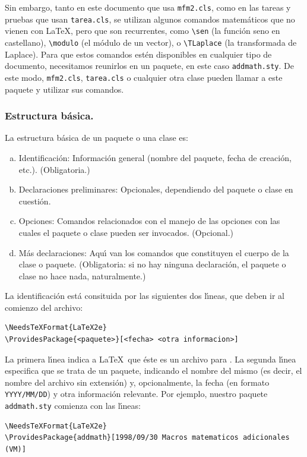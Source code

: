 {Sin embargo, tanto en este documento que usa \verb+mfm2.cls+, como
en las tareas y pruebas que usan \verb+tarea.cls+, se utilizan algunos
comandos matem\'aticos que no vienen con \LaTeX, pero que son
recurrentes, como \verb+\sen+ (la funci\'on seno en castellano),
\verb+\modulo+ (el m\'odulo de un vector),
 o \verb+\TLaplace+ (la transformada de Laplace).  Para que estos
 comandos est\'en disponibles en cualquier tipo de documento,
 necesitamos reunirlos en un paquete, en este caso
 \verb+addmath.sty+. De este modo, \verb+mfm2.cls+,
 \verb+tarea.cls+ o cualquier otra clase 
pueden llamar a este paquete y utilizar sus comandos. 

\subsubsection{Estructura b\'asica.}

La estructura b\'asica de un paquete o una clase es: 
\begin{enumerate}[a)]
\item Identificaci\'on: Informaci\'on general (nombre del
  paquete, fecha de creaci\'on, etc.). (Obligatoria.)
\item Declaraciones preliminares: Opcionales, dependiendo del paquete
  o clase en cuesti\'on. 
\item Opciones: Comandos relacionados con el manejo de las opciones
  con las cuales el paquete o clase pueden ser invocados. (Opcional.)
\item M\'as declaraciones: Aqu\'{\i} van los comandos que constituyen
  el cuerpo de la clase o paquete. (Obligatoria: si no hay ninguna
  declaraci\'on, el paquete o clase no hace nada, naturalmente.)
\end{enumerate}

La identificaci\'on est\'a consituida por las siguientes dos
l\'{\i}neas, que deben ir al comienzo del archivo:
\begin{verbatim}
\NeedsTeXFormat{LaTeX2e}
\ProvidesPackage{<paquete>}[<fecha> <otra informacion>]
\end{verbatim}

La primera l\'{\i}nea indica a \LaTeX\ que \'este es un archivo para
\LaTeXe. La segunda l\'{\i}nea especifica que se trata de un paquete,
indicando el nombre del mismo (es decir, el nombre del archivo sin
extensi\'on) y, opcionalmente, la fecha (en formato 
\verb+YYYY/MM/DD+) y otra informaci\'on relevante. Por ejemplo,
nuestro paquete \verb+addmath.sty+ comienza con las l\'{\i}neas:
\begin{verbatim}
\NeedsTeXFormat{LaTeX2e}
\ProvidesPackage{addmath}[1998/09/30 Macros matematicos adicionales (VM)]
\end{verbatim}

}
